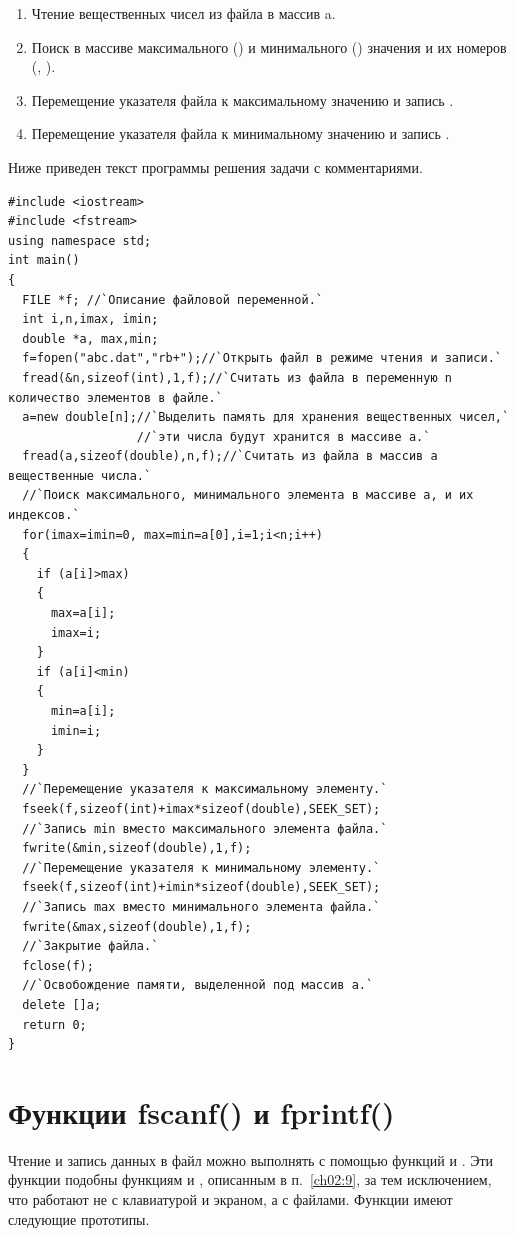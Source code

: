 \begin{enumerate}
\item Чтение вещественных чисел из файла в массив a.
\item Поиск в массиве  максимального () и минимального
() значения и их номеров (, ).
\item Перемещение указателя файла к максимальному значению и запись .
\item Перемещение указателя файла к минимальному значению и запись .
\end{enumerate}
Ниже приведен текст программы решения задачи с комментариями.
\begin{lstlisting}
#include <iostream>
#include <fstream>
using namespace std;
int main()
{
  FILE *f; //`Описание файловой переменной.` 
  int i,n,imax, imin;
  double *a, max,min;
  f=fopen("abc.dat","rb+");//`Открыть файл в режиме чтения и записи.`
  fread(&n,sizeof(int),1,f);//`Считать из файла в переменную n количество элементов в файле.`
  a=new double[n];//`Выделить память для хранения вещественных чисел,`
                  //`эти числа будут хранится в массиве a.`
  fread(a,sizeof(double),n,f);//`Считать из файла в массив a вещественные числа.`
  //`Поиск максимального, минимального элемента в массиве a, и их индексов.`
  for(imax=imin=0, max=min=a[0],i=1;i<n;i++) 
  {
    if (a[i]>max) 
    {
      max=a[i];
      imax=i;
    }
    if (a[i]<min)
    {
      min=a[i];
      imin=i;
    }
  }
  //`Перемещение указателя к максимальному элементу.`
  fseek(f,sizeof(int)+imax*sizeof(double),SEEK_SET);
  //`Запись min вместо максимального элемента файла.`
  fwrite(&min,sizeof(double),1,f);
  //`Перемещение указателя к минимальному элементу.`
  fseek(f,sizeof(int)+imin*sizeof(double),SEEK_SET);
  //`Запись max вместо минимального элемента файла.`
  fwrite(&max,sizeof(double),1,f);
  //`Закрытие файла.`
  fclose(f);
  //`Освобождение памяти, выделенной под массив a.`
  delete []a;
  return 0;
}
\end{lstlisting}

\section[Функции fscanf() и fprintf()]{Функции fscanf() и fprintf()}
Чтение и запись данных в файл можно выполнять с помощью функций  и
. Эти функции подобны функциям  и
, описанным в п.~\ref{ch02:9}, за тем исключением, что работают не с клавиатурой и
экраном, а с файлами. Функции имеют следующие прототипы.

